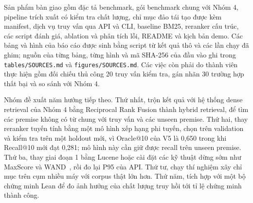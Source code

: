 \documentclass[11pt,a4paper,oneside]{report}
\newcommand{\code}[1]{\texttt{#1}}
\begin{document}
Sản phẩm bàn giao gồm đặc tả benchmark, gói benchmark chung với Nhóm 4, pipeline trích xuất có kiểm tra chất lượng, chỉ mục đảo tái tạo được kèm manifest,
dịch vụ truy vấn qua API và CLI, baseline BM25, reranker cấu trúc, các script đánh giá, ablation và phân tích lỗi, README
và kịch bản demo. Các bảng và hình của báo cáo được sinh bằng script từ kết quả thô và các lần chạy đã ghim; nguồn của
từng bảng, từng hình và mã SHA-256 của đầu vào ghi trong \code{tables/SOURCES.md} và \code{figures/SOURCES.md}. Các việc còn phải do thành viên thực
hiện gồm đối chiếu thủ công 20 truy vấn kiểm tra, gán nhãn 30 trường hợp thất bại và so sánh với Nhóm 4.

Nhóm đề xuất năm hướng tiếp theo. Thứ nhất, trộn kết quả với hệ thống dense retrieval của Nhóm 4 bằng Reciprocal Rank Fusion
thành hybrid retrieval, để tìm các premise không có từ chung với truy vấn và các unseen premise. Thứ hai, thay reranker tuyến tính bằng một mô hình xếp
hạng phi tuyến, chọn trên validation và kiểm tra trên một holdout mới, vì Oracle@10 của V5 là 0,650 trong khi Recall@10 mới
đạt 0,281; mô hình này cần giữ được recall trên unseen premise. Thứ ba, thay giai đoạn 1 bằng Lucene hoặc cài đặt các
kỹ thuật dừng sớm như MaxScore và WAND~\cite{broder2003}, rồi đo lại P95 của API. Thứ tư, chạy thí nghiệm xây chỉ mục trên
cụm nhiều máy với corpus thật lớn hơn. Thứ năm, tích hợp với một bộ chứng minh Lean để đo ảnh hưởng của chất lượng truy hồi
tới tỉ lệ chứng minh thành công.
\end{document}
